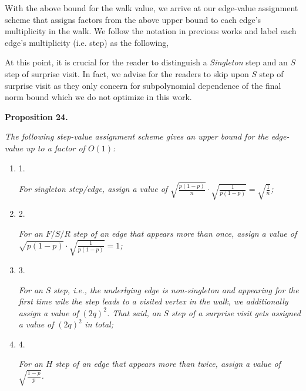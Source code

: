 With the above bound for the walk value, we arrive at our edge-value assignment scheme that assigns factors from the above upper bound to each edge’s multiplicity in the walk. We follow the notation in previous works and label each edge’s multiplicity (i.e. step) as the following,\par




At this point, it is crucial for the reader to distinguish a \emph{Singleton} step and an $S$ step of surprise visit. In fact, we advise for the readers to skip upon $S$ step of surprise visit as they only concern for subpolynomial dependence of the final norm bound which we do not optimize in this work.\par





\par\medskip\noindent\textbf{
\textbf{Proposition 24}\textbf{.}
}\par



\emph{The following step-value assignment scheme gives an upper bound for the edge-value up to a factor of $O(1)$:}\par


\begin{enumerate}


\item[] 
1. 


\emph{For singleton step/edge, assign a value of }$\sqrt{\frac{p(1-p)}{n}}\cdot\sqrt{\frac{1}{p(1-p)}}=\sqrt{\frac{1}{n}}$\emph{;}\par





\item[] 
2. 


\emph{For an }$F/S/R$\emph{ step of an edge that appears more than once, assign a value of }$\sqrt{p(1-p)}\cdot\sqrt{\frac{1}{p(1-p)}}=1$\emph{;}\par





\item[] 
3. 


\emph{For an }$S$\emph{ step, i.e., the underlying edge is non-singleton and appearing for the first time wile the step leads to a visited vertex in the walk, we additionally assign a value of }$(2q)^{2}$\emph{. That said, an }$S$\emph{ step of a surprise visit gets assigned a value of }$(2q)^{2}$\emph{ in total;}\par





\item[] 
4. 


\emph{For an }$H$\emph{ step of an edge that appears more than twice, assign a value of }$\sqrt{\frac{1-p}{p}}$\emph{.}\par





\end{enumerate}



